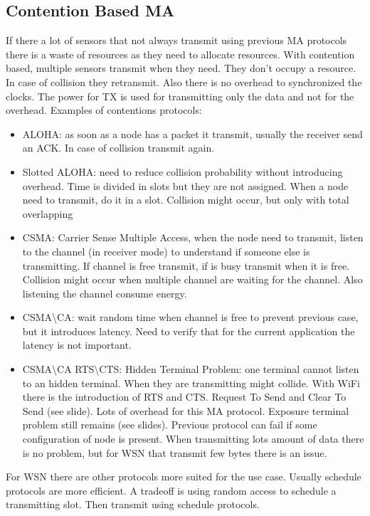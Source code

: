 \documentclass[]{article}
\begin{document}
\subsection{Contention Based MA}
If there a lot of sensors that not always transmit using previous MA protocols there is a waste of resources as they need to allocate resources. With contention based, multiple sensors transmit when they need.  They don't occupy a resource. In case of collision they retransmit. Also there is no overhead to synchronized the clocks. The power for TX is used for transmitting only the data and not for the overhead. 
 Examples of contentions protocols:
 \begin{itemize}
 	\item ALOHA: as soon as a node has a packet it transmit, usually the receiver send an ACK. In case of collision transmit again. 
 	\item Slotted ALOHA: need to reduce collision probability without introducing overhead. Time is divided in slots but they are not assigned. When a node need to transmit, do it in a slot. Collision might occur, but only with total overlapping
 	\item CSMA: Carrier Sense Multiple Access, when the node need to transmit, listen to the channel (in receiver mode) to understand if someone else is transmitting. If channel is free transmit, if is busy transmit when it is free. Collision might occur when multiple channel are waiting for the channel. Also listening the channel consume energy. 
 	\item CSMA\textbackslash CA: wait random time when channel is free to prevent previous case, but it introduces latency. Need to verify that for the current application the latency is not important. 
 	\item CSMA\textbackslash CA RTS\textbackslash CTS: Hidden Terminal Problem: one terminal cannot listen to an hidden terminal. When they are transmitting might collide. With WiFi there is the introduction of RTS and CTS. Request To Send and Clear To Send (see slide). Lots of overhead for this MA protocol. Exposure terminal problem still remains (see slides). Previous protocol can fail if some configuration of node is present. When transmitting lots amount of data there is no problem, but for WSN that transmit few bytes there is an issue. 
 \end{itemize}
For WSN there are other protocols more suited for the use case. Usually schedule protocols are more efficient. A tradeoff is using random access to schedule a transmitting slot. Then transmit using schedule protocols. 
\end{document}
